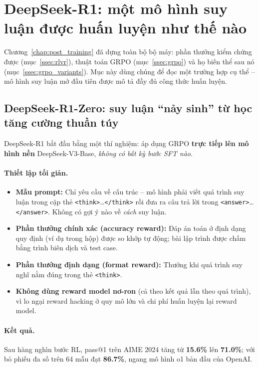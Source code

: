 
\section{DeepSeek-R1: một mô hình suy luận được huấn luyện như thế nào}
\label{sec:rl_reasoning}

Chương~\ref{chap:post_training} đã dựng toàn bộ bộ máy: phần thưởng kiểm chứng được (mục~\ref{ssec:rlvr}), thuật toán GRPO (mục~\ref{ssec:grpo}) và họ biến thể sau nó (mục~\ref{ssec:grpo_variants}). Mục này dùng chúng để đọc một trường hợp cụ thể -- mô hình suy luận mở đầu tiên được mô tả đầy đủ công thức huấn luyện.

\subsection{DeepSeek-R1-Zero: suy luận “nảy sinh” từ học tăng cường thuần túy}
\label{ssec:r1_zero}
DeepSeek-R1 \cite{deepseekai2025r1} bắt đầu bằng một thí nghiệm: áp dụng GRPO \textbf{trực tiếp lên mô hình nền} DeepSeek-V3-Base, \emph{không có bất kỳ bước SFT nào}.

\paragraph{Thiết lập tối giản.}
\begin{itemize}
	\item \textbf{Mẫu prompt:} Chỉ yêu cầu về cấu trúc -- mô hình phải viết quá trình suy luận trong cặp thẻ \texttt{<think>}\ldots\texttt{</think>} rồi đưa ra câu trả lời trong \texttt{<answer>}\ldots\texttt{</answer>}. Không có gợi ý nào về \emph{cách} suy luận.
	\item \textbf{Phần thưởng chính xác (accuracy reward):} Đáp án toán ở định dạng quy định (ví dụ trong hộp) được so khớp tự động; bài lập trình được chấm bằng trình biên dịch và test case.
	\item \textbf{Phần thưởng định dạng (format reward):} Thưởng khi quá trình suy nghĩ nằm đúng trong thẻ \texttt{<think>}.
	\item \textbf{Không dùng reward model nơ-ron} (cả theo kết quả lẫn theo quá trình), vì lo ngại reward hacking ở quy mô lớn và chi phí huấn luyện lại reward model.
\end{itemize}

\paragraph{Kết quả.} Sau hàng nghìn bước RL, pass@1 trên AIME 2024 tăng từ \textbf{15.6\%} lên \textbf{71.0\%}; với bỏ phiếu đa số trên 64 mẫu đạt \textbf{86.7\%}, ngang mô hình o1 bản đầu của OpenAI.

